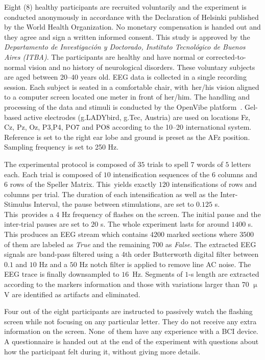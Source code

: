 \documentclass[brainsci,article,accept,moreauthors,pdftex,10pt,a4paper]{mdpi}
\begin{document}
Eight (8) healthy participants are recruited voluntarily and the experiment is conducted anonymously in accordance with the Declaration of Helsinki published by the World Health Organization.  No monetary compensation is handed out and they agree and sign a written informed consent.  This study is approved by the \textit{Departamento de Investigación y Doctorado, Instituto Tecnológico de Buenos Aires (ITBA)}.  The participants are healthy and have normal or corrected-to-normal vision and no history of neurological disorders. These voluntary subjects are aged between 20--40 years old.  EEG data is collected in a single recording session. Each subject is seated in a comfortable chair, with~her/his vision aligned to a computer screen located one meter in front of her/him.  The handling and processing of the data and stimuli is conducted by the OpenVibe platform~\citep{Renard2010}.  Gel-based active electrodes (g.LADYbird, g.Tec, Austria) are used on locations Fz, Cz, Pz, Oz, P3,P4, PO7 and PO8 according to the 10--20 international system.  Reference is set to the right ear lobe and ground is preset as the AFz position.   Sampling frequency is set to 250 Hz.

The experimental protocol is composed of $35$ trials to spell $7$ words of $5$ letters each.  Each trial is composed of $10$ intensification sequences of the $6$ columns and $6$ rows of the Speller Matrix.  This~yields exactly $120$ intensifications of rows and columns per trial.  The duration of each intensification as well as the Inter-Stimulus Interval, the pause between stimulations, are set to $0.125$ s.  This~provides a $4$ Hz frequency of flashes on the screen.  The initial pause and the inter-trial pauses are set to $20$ s.  The whole experiment lasts for around $1400$ s.  This produces an EEG stream which contains $4200$ marked sections where $3500$ of them are labeled as \textit{True} and the remaining $700$ as \textit{False}.  The extracted EEG signals are band-pass filtered using a 4th order Butterworth digital filter between $0.1$ and $10$ Hz and a $50$ Hz notch filter is applied to remove line AC noise.  The EEG trace is finally downsampled to $16$~Hz.  Segments of $1$-s length are extracted according to the markers information and those with variations larger than 70 $\upmu$V are identified as artifacts and eliminated.

Four out of the eight participants are instructed to passively watch the flashing screen while not focusing on any particular letter. They do not receive any extra information on the screen.  None~of them have any experience with a BCI device.  A questionnaire is handed out at the end of the experiment with questions about how the participant felt during it, without giving more details.  
\end{document}
